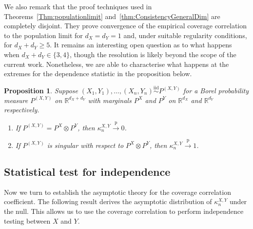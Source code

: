 \documentclass[11pt]{article}
\newtheorem{prop}[thm]{Proposition}
\newcommand{\pto}{\xrightarrow{\,\mathrm{p}\,} }
\newcommand{\iid}{\stackrel{\mathrm{iid}}\sim}
\begin{document}

We also remark that the proof techniques used in Theorems~\ref{Thm:populationlimit} and~\ref{thm:ConsistencyGeneralDim} are completely disjoint. They prove convergence of the empirical coverage correlation to the population limit for $d_X=d_Y=1$ and, under suitable regularity conditions, for $d_X + d_Y \geq 5$. It remains an interesting open question as to what happens when $d_X + d_Y \in\{3, 4\}$, though the resolution is likely beyond the scope of the current work. Nonetheless, we are able to characterise what happens at the extremes for the dependence statistic in the proposition below. 

\begin{prop}
\label{Prop:MultivariateLimit}
    Suppose $(X_1,Y_1),\ldots,(X_n,Y_n)\iid P^{(X,Y)}$ for a Borel probability measure $P^{(X,Y)}$ on $\mathbb{R}^{d_X+d_Y}$ with marginals $P^X$ and $P^Y$ on $\mathbb{R}^{d_X}$ and $\mathbb{R}^{d_Y}$ respectively. 
    \begin{enumerate}[label = (\roman*)]
        \item If $P^{(X,Y)} = P^X\otimes P^Y$, then $\kappa_n^{X,Y}\pto 0$.
        \item If $P^{(X,Y)}$ is singular with respect to $P^X\otimes P^Y$, then $\kappa_n^{X,Y}\pto 1$.
    \end{enumerate}
\end{prop}




\subsection{Statistical test for independence}\label{sec:nullCLT}
Now we turn to establish the asymptotic theory for the coverage correlation coefficient. The following result derives the asymptotic distribution of $\kappa_n^{X,Y}$ under the null. This allows us to use the coverage correlation to perform independence testing between $X$ and $Y$. 
\end{document}
